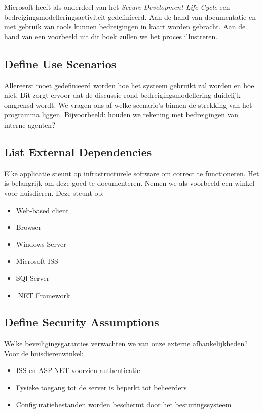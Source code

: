 \documentclass[../main.tex]{subfiles}
\begin{document}
Microsoft heeft als onderdeel van het \textit{Secure Development Life Cycle} een bedreigingsmodelleringsactiviteit gedefinieerd. Aan de hand van documentatie en met gebruik van tools kunnen bedreigingen in kaart worden gebracht. Aan de hand van een voorbeeld uit dit boek zullen we het proces illustreren.

\subsection{Define Use Scenarios}
Allereerst moet gedefinieerd worden hoe het systeem gebruikt zal worden en hoe niet. Dit zorgt ervoor dat de discussie rond bedreigingsmodellering duidelijk omgrensd wordt. We vragen ons af welke scenario's binnen de strekking van het programma liggen. Bijvoorbeeld: houden we rekening met bedreigingen van interne agenten?

\subsection{List External Dependencies}
Elke applicatie steunt op infrastructurele software om correct te functioneren. Het is belangrijk om deze goed te documenteren. Nemen we als voorbeeld een winkel voor huisdieren. Deze steunt op:
\begin{multicols}{2}
\begin{itemize}
	\item Web-based client
	\item Browser
	\item Windows Server
	\item Microsoft ISS
	\item SQl Server
	\item .NET Framework
\end{itemize}
\end{multicols}

\subsection{Define Security Assumptions}
Welke beveiligingsgaranties verwachten we van onze externe afhankelijkheden? Voor de huisdierenwinkel:
\begin{itemize}
	\item ISS en ASP.NET voorzien authenticatie
	\item Fysieke toegang tot de server is beperkt tot beheerders
	\item Configuratiebestanden worden beschermt door het besturingssysteem
\end{itemize}
\end{document}
